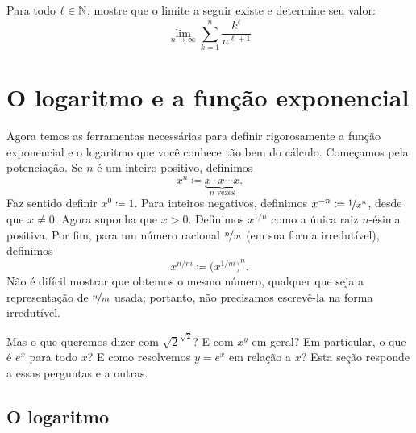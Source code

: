 \begin{exercise}
Para todo $\ell \in {\mathbb{N}}$,
mostre que o limite a seguir existe e determine seu valor:
\begin{equation*}
\lim_{n\to\infty} \sum_{k=1}^n \frac{k^\ell}{n^{\ell+1}}
\end{equation*}
\end{exercise}


\sectionnewpage
\section{O logaritmo e a função exponencial}
\label{sec:logandexp}



Agora temos as ferramentas necessárias para definir rigorosamente a função
exponencial e o logaritmo que você conhece tão bem do cálculo. Começamos
pela potenciação.
Se $n$ é um inteiro positivo, definimos
\begin{equation*}
x^n \coloneqq \underbrace{x \cdot x \cdots x}_{n \text{ vezes}} .
\end{equation*}
Faz sentido definir $x^0 \coloneqq 1$.
Para inteiros negativos, definimos $x^{-n} \coloneqq \nicefrac{1}{x^n}$, desde que
$x \neq 0$.
Agora suponha que $x > 0$.
Definimos $x^{1/n}$ como
a única raiz $n$-ésima positiva. Por fim, para um número racional
$\nicefrac{n}{m}$ (em sua forma irredutível), definimos
\begin{equation*}
x^{n/m} \coloneqq {\bigl(x^{1/m}\bigr)}^n .
\end{equation*}
Não é difícil mostrar que obtemos o mesmo número, qualquer que seja a
representação de $\nicefrac{n}{m}$ usada; portanto, não precisamos escrevê-la
na forma irredutível.

Mas o que queremos dizer com $\sqrt{2}^{\sqrt{2}}$? E com
$x^y$ em geral? Em particular, o que é $e^x$ para todo $x$?
E como resolvemos $y=e^x$ em relação a $x$?
Esta seção responde a essas perguntas e a outras.

\subsection{O logaritmo}

